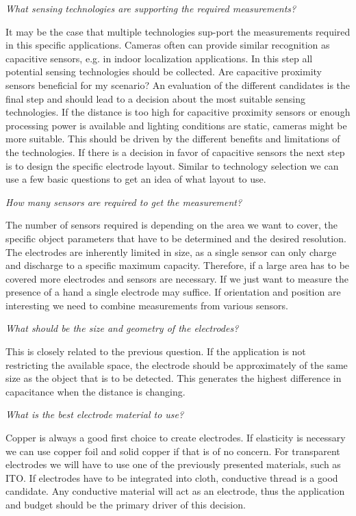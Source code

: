 \textit{What sensing technologies are supporting the required measurements?}


It may be the case that multiple technologies sup-port the measurements required in this specific applications. Cameras often can provide similar recognition as capacitive sensors, e.g. in indoor localization applications. In this step all potential sensing technologies should be collected.
Are capacitive proximity sensors beneficial for my scenario?
An evaluation of the different candidates is the final step and should lead to a decision about the most suitable sensing technologies. If the distance is too high for capacitive proximity sensors or enough processing power is available and lighting conditions are static, cameras might be more suitable. This should be driven by the different benefits and limitations of  the technologies.
If there is a decision in favor of capacitive sensors the next step is to design the specific electrode layout. Similar to technology selection we can use a few basic questions to get an idea of what layout to use.


\textit{How many sensors are required to get the measurement?}


The number of sensors required is depending on the area we want to cover, the specific object parameters that have to be determined and the desired resolution. The electrodes are inherently limited in size, as a single sensor can only charge and discharge to a specific maximum capacity. Therefore, if a large area has to be covered more electrodes and sensors are necessary. If we just want to measure the presence of a hand a single electrode may suffice. If orientation and position are interesting we need to combine measurements from various sensors.


\textit{What should be the size and geometry of the electrodes?}


This is closely related to the previous question. If the application is not restricting the available space, the electrode should be approximately of the same size as the object that is to be detected. This generates the highest difference in capacitance when the distance is changing. 


\textit{What is the best electrode material to use?}


Copper is always a good first choice to create electrodes. If elasticity is necessary we can use copper foil and solid copper if that is of no concern. For transparent electrodes we will have to use one of the previously presented materials, such as ITO. If electrodes have to be integrated into cloth, conductive thread is a good candidate. Any conductive material will act as an electrode, thus the application and budget should be the primary driver of this decision.


